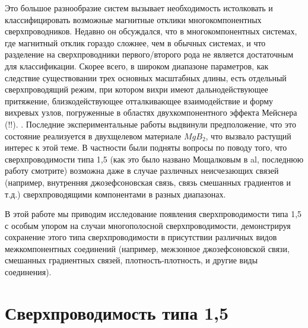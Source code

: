 Это большое разнообразие систем вызывает необходимость истолковать и 
классифицировать возможные магнитные отклики многокомпонентных 
сверхпроводников. Недавно он обсуждался, что в многокомпонентных системах, 
где магнитный отклик гораздо сложнее, чем в обычных системах, и что разделение 
на сверхпроводники первого/второго рода не является достаточным для 
классификации. Скорее всего, в широком диапазоне параметров, как следствие 
существовании трех основных масштабных длины, есть отдельный сверхпроводящий 
режим, при котором вихри имеют дальнодействующее притяжение, близкодействующее 
отталкивающее взаимодействие и форму вихревых узлов, погруженные в областях 
двухкомпонентного эффекта Мейснера (!!). \cite{bib:1,bib:2}. Последние 
экспериментальные работы \cite{bib:16,bib:17} выдвинули предположение, что 
это состояние реализуется в двухщелевом материале \( MgB_2 \), что вызвало 
растущий интерес к этой теме. В частности были подняты вопросы по поводу того, 
что сверхпроводимости типа 1,5 (как это было названо Мощалковым в 
al\cite{bib:16}, последнюю работу смотрите\cite{bib:18}) возможна даже в 
случае различных неисчезающих связей (например, внутренняя джозефсоновская 
связь, связь смешанных градиентов и т.д.) сверхпроводящими компонентами в 
разных диапазонах.

В этой работе мы приводим исследование появления сверхпроводимости типа 1,5 с 
особым упором на случаи многополосной сверхпроводимости, демонстрируя 
сохранение этого типа сверхпроводимости в присутствии различных видов 
межкомпонентных соединений (например, межзонное джозефсоновской связи, 
смешанных градиентных связей, плотность-плотность, и другие виды соединения).

\section{Сверхпроводимость типа 1,5}
\label{sec:1-1}

